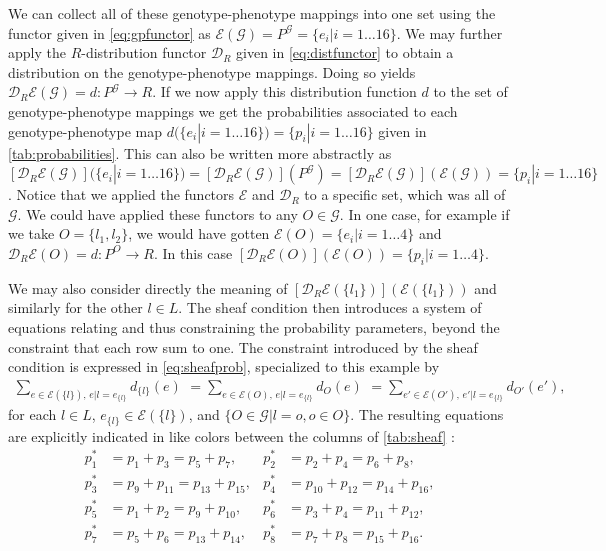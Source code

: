 We can collect all of these genotype-phenotype mappings into one set using the functor given in \ref{eq:gpfunctor} as $\mathcal{E}(\mathcal{G}) = P^{\mathcal{G}} = \{e_i | i=1 \ldots 16 \}$. We may further apply the $R$-distribution functor $\mathcal{D}_R$ given in \ref{eq:distfunctor} to obtain a distribution on the genotype-phenotype mappings. Doing so yields  $\mathcal{D}_R\mathcal{E}(\mathcal{G})=d \colon P^\mathcal{G} \rightarrow R$. If we now apply this distribution function $d$ to the set of genotype-phenotype mappings we get the probabilities associated to each genotype-phenotype map $d(\{e_i | i=1 \ldots 16 \}) = \{p_i|i=1 \ldots 16\}$ given in \ref{tab:probabilities}. This can also be written more abstractly as $\left[\mathcal{D}_R\mathcal{E}(\mathcal{G})\right](\{e_i | i=1 \ldots 16 \}) = \left[\mathcal{D}_R\mathcal{E}(\mathcal{G})\right](P^\mathcal{G}) = \left[\mathcal{D}_R\mathcal{E}(\mathcal{G})\right](\mathcal{E}(\mathcal{G})) = \{p_i|i=1 \ldots 16\}$. Notice that we applied the functors $\mathcal{E}$ and $\mathcal{D}_R$ to a specific set, which was all of $\mathcal{G}$. We could have applied these functors to any $O \in \mathcal{G}$. In one case, for example if we take $O = \{l_1, l_2\}$, we would have gotten $\mathcal{E}(O) = \{e_i|i=1 \ldots 4\}$ and $\mathcal{D}_R\mathcal{E}(O) = d \colon P^O \rightarrow R$. In this case $\left[\mathcal{D}_R\mathcal{E}(O)\right](\mathcal{E}(O)) = \{p_i|i=1 \ldots 4\}$.

We may also consider directly the meaning of $\left[\mathcal{D}_R\mathcal{E}(\{l_1\})\right](\mathcal{E}(\{l_1\}))$ and similarly for the other $l \in L$. The sheaf condition then introduces a system of equations relating and thus constraining the probability parameters, beyond the constraint that each row sum to one. The constraint introduced by the sheaf condition is expressed in \ref{eq:sheafprob}, specialized to this example by
\begin{eqnarray}\label{eq:sheafprob2}
\sum_{e \in \mathcal{E}(\{l\}),\, e|l=e_{\{l\}}} d_{\{l\}}(e) \,\, = \sum_{e \in \mathcal{E}(O),\, e|l=e_{\{l\}}} d_O(e) \,\, = \sum_{e' \in \mathcal{E}(O'),\, e'|l=e_{\{l\}}} d_{O'}(e'),
\end{eqnarray}
for each $l \in L$, $e_{\{l\}} \in \mathcal{E}(\{l\})$, and $\{O \in \mathcal{G}|l=o, o \in O\}$. The resulting equations are explicitly indicated in like colors between the columns of \ref{tab:sheaf} :
\begin{equation}
\begin{aligned}\label{eq:pparsys}
p^*_1 &= p_1 + p_3 = p_5 + p_7, &
p^*_2 &= p_2 + p_4 = p_6 + p_8,\\
p^*_3 &= p_9 + p_{11} = p_{13} + p_{15},&
p^*_4 &= p_{10} + p_{12} = p_{14} + p_{16},\\
p^*_5 &= p_1 + p_2 = p_9 + p_{10},&
p^*_6 &= p_3 + p_4 = p_{11} + p_{12},\\
p^*_7 &= p_5 + p_6 = p_{13} + p_{14},&
p^*_8 &= p_7 + p_8 = p_{15} + p_{16}.
\end{aligned}
\end{equation}

